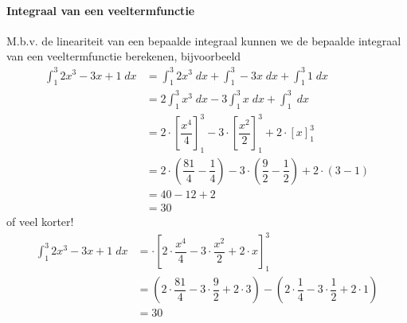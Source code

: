 \documentclass[a4paper,12pt, twoside]{article}
\begin{document}
\paragraph*{Integraal van een veeltermfunctie}
M.b.v. de lineariteit van een bepaalde integraal kunnen we de bepaalde integraal van een veeltermfunctie berekenen, bijvoorbeeld
\begin{align*}
  \int_1^3 2x^3-3x+1 \;dx &= \int_1^3 2x^3 \;dx + \int_1^3 -3x \;dx + \int_1^3 1 \;dx\\
                       &= 2\int_1^3 x^3 \;dx - 3\int_1^3 x \;dx + \int_1^3 \;dx\\
                       &= 2\cdot\left[\dfrac{x^4}{4}\right]_1^3
                         - 3\cdot\left[\dfrac{x^2}{2}\right]_1^3
                         + 2\cdot\left[x\right]_1^3\\
                       &= 2\cdot \left(\dfrac{81}{4}-\dfrac{1}{4}\right)
                         - 3\cdot \left(\dfrac{9}{2}-\dfrac{1}{2}\right)
                         + 2\cdot \left(3-1\right)\\
                       &= 40 - 12 + 2\\
                       &= 30
\end{align*}
of veel korter!
\begin{align*}
  \int_1^3 2x^3-3x+1 \;dx &= \cdot\left[2\cdot\dfrac{x^4}{4} - 3\cdot\dfrac{x^2}{2} +2\cdot x\right]_1^3\\
                       &= (2\cdot \dfrac{81}{4} - 3\cdot \dfrac{9}{2} + 2\cdot 3)
                         - (2\cdot \dfrac{1}{4} - 3\cdot \dfrac{1}{2} + 2\cdot 1)\\
                       &= 30
\end{align*}
\end{document}
